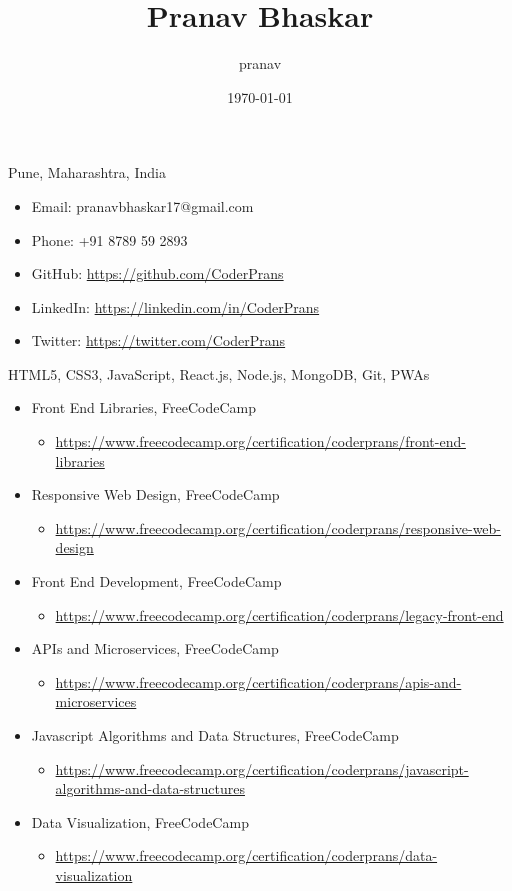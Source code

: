 \documentclass[11pt]{article}
\author{pranav}
\date{\today}
\title{Pranav Bhaskar}
\begin{document}
\maketitle
Pune, Maharashtra, India
\begin{itemize}
\item Email: pranavbhaskar17@gmail.com
\item Phone: +91 8789 59 2893
\item GitHub: \url{https://github.com/CoderPrans}
\item LinkedIn: \url{https://linkedin.com/in/CoderPrans}
\item Twitter: \url{https://twitter.com/CoderPrans}
\end{itemize}
HTML5, CSS3, JavaScript, React.js,
Node.js, MongoDB, Git, PWAs
\begin{itemize}
\item Front End Libraries, FreeCodeCamp
\begin{itemize}
\item \url{https://www.freecodecamp.org/certification/coderprans/front-end-libraries}
\end{itemize}
\item Responsive Web Design, FreeCodeCamp
\begin{itemize}
\item \url{https://www.freecodecamp.org/certification/coderprans/responsive-web-design}
\end{itemize}
\item Front End Development, FreeCodeCamp
\begin{itemize}
\item \url{https://www.freecodecamp.org/certification/coderprans/legacy-front-end}
\end{itemize}
\item APIs and Microservices, FreeCodeCamp
\begin{itemize}
\item \url{https://www.freecodecamp.org/certification/coderprans/apis-and-microservices}
\end{itemize}
\item Javascript Algorithms and Data Structures, FreeCodeCamp
\begin{itemize}
\item \url{https://www.freecodecamp.org/certification/coderprans/javascript-algorithms-and-data-structures}
\end{itemize}
\item Data Visualization, FreeCodeCamp
\begin{itemize}
\item \url{https://www.freecodecamp.org/certification/coderprans/data-visualization}
\end{itemize}
\end{itemize}
\end{document}
